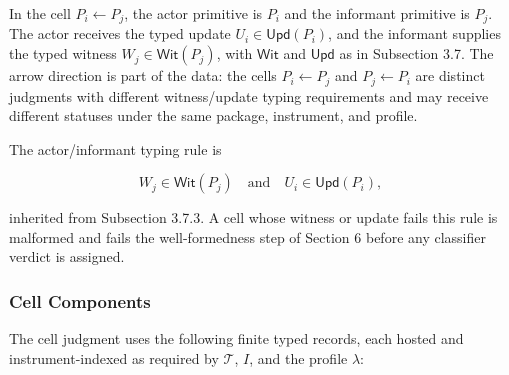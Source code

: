 \documentclass[11pt]{article}
\theoremstyle{definition}
\begin{document}
In the cell \(P_i\leftarrow P_j\), the actor primitive is \(P_i\) and the informant primitive is \(P_j\). The actor receives the typed update \(U_i\in\mathsf{Upd}(P_i)\), and the informant supplies the typed witness \(W_j\in\mathsf{Wit}(P_j)\), with \(\mathsf{Wit}\) and \(\mathsf{Upd}\) as in Subsection 3.7. The arrow direction is part of the data: the cells \(P_i\leftarrow P_j\) and \(P_j\leftarrow P_i\) are distinct judgments with different witness/update typing requirements and may receive different statuses under the same package, instrument, and profile.

The actor/informant typing rule is

\[
W_j\in\mathsf{Wit}(P_j)\quad\text{and}\quad U_i\in\mathsf{Upd}(P_i),
\]

inherited from Subsection 3.7.3. A cell whose witness or update fails this rule is malformed and fails the well-formedness step of Section 6 before any classifier verdict is assigned.

\subsubsection{Cell Components}

The cell judgment uses the following finite typed records, each hosted and instrument-indexed as required by \(\mathcal T\), \(I\), and the profile \(\lambda\):
\end{document}
